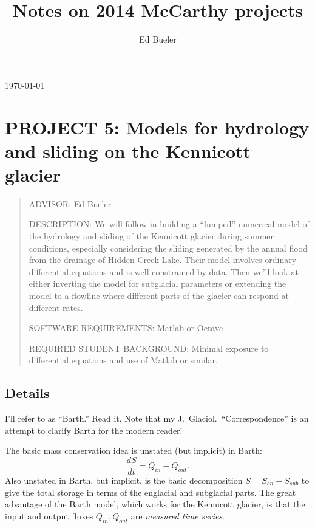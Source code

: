 \documentclass[11pt,final]{amsart}%
\title[]{Notes on 2014 McCarthy projects}
\author[]{Ed Bueler}
\begin{document}

\scriptsize \hfill \today \normalsize
\vspace{0.5in}

\maketitle
\thispagestyle{empty}

\setcounter{equation}{14}

\section*{PROJECT 5: Models for hydrology and sliding on the Kennicott glacier}

\begin{quote}
\noindent ADVISOR: Ed Bueler

\medskip
\noindent DESCRIPTION: We will follow \cite{Bartholomausetal2011} in building a ``lumped'' numerical model of the hydrology and sliding of the Kennicott glacier during summer conditions, especially considering the sliding generated by the annual flood from the drainage of Hidden Creek Lake.  Their model involves ordinary differential equations and is well-constrained by data.  Then we'll look at either inverting the model for subglacial parameters or extending the model to a flowline where different parts of the glacier can respond at different rates.

\medskip
\noindent SOFTWARE REQUIREMENTS: Matlab or Octave

\medskip
\noindent REQUIRED STUDENT BACKGROUND: Minimal exposure to differential equations and use of Matlab or similar.
\end{quote}

\subsection*{Details}  I'll refer to  \cite{Bartholomausetal2011} as ``Barth.''  Read it.  Note that my J.~Glaciol.~``Correspondence'' \citep{Bueler2014correspondence} is an attempt to clarify Barth for the modern reader!

The basic mass conservation idea is unstated (but implicit) in Barth:
\begin{equation}
\frac{dS}{dt} = Q_{in} - Q_{out}. \label{eq:massconserve}
\end{equation}
Also unstated in Barth, but implicit, is the basic decomposition $S = S_{en} + S_{sub}$ to give the total storage in terms of the englacial and subglacial parts.  The great advantage of the Barth model, which works for the Kennicott glacier, is that the input and output fluxes $Q_{in},Q_{out}$ are \emph{measured time series}.
\end{document}

